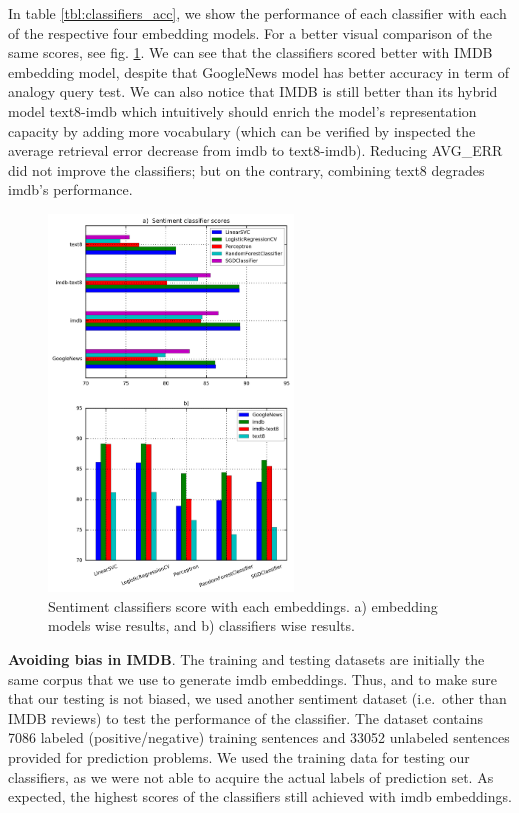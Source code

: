 \documentclass[11pt,letterpaper]{article}
\begin{document}
In table \ref{tbl:classifiers_acc}, we show the performance of each
classifier with each of the respective four embedding models.
For a better visual comparison of the same scores, see fig. \ref{fig:sentiment_score}. We can see that the classifiers scored better with IMDB embedding model, despite that GoogleNews model has better accuracy in
term of analogy query test. We can also notice that IMDB is still better
than its hybrid model text8-imdb which intuitively should enrich the
model's representation capacity by adding more vocabulary (which can be
verified by inspected the average retrieval error decrease from imdb to
text8-imdb). Reducing AVG\_ERR did not improve the classifiers; but on
the contrary, combining text8 degrades imdb's performance.

\begin{figure}
\centering
\includegraphics[width=65mm]{img/sent-clfs-score3.png}
\caption{Sentiment classifiers score with each embeddings. a) embedding models wise results, and b) classifiers wise results.}
\label{fig:sentiment_score}
\end{figure}

\textbf{Avoiding bias in IMDB}.  The training and testing datasets are initially the same corpus that we
use to generate imdb embeddings. Thus, and to make sure that our testing
is not biased, we used another sentiment dataset (i.e.~other than IMDB
reviews) to test the performance of the classifier. The dataset contains
7086 labeled (positive/negative) training sentences and 33052 unlabeled
sentences provided for prediction problems. We used the training data
for testing our classifiers, as we were not able to acquire the actual
labels of prediction set. As expected, the highest scores of the
classifiers still achieved with imdb embeddings.
\end{document}
